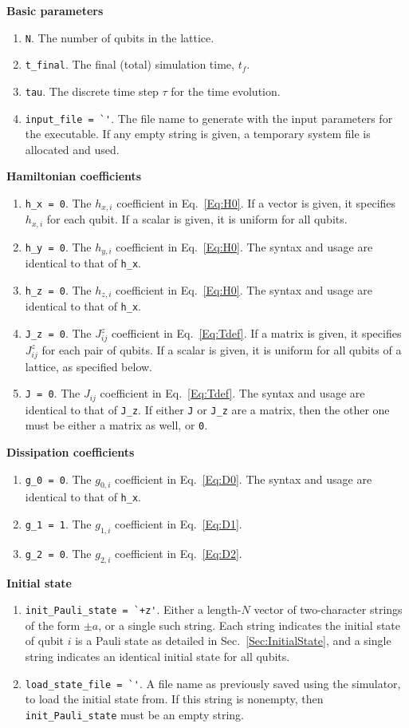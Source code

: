 \documentclass[aps,10pt,pra,twocolumn,groupedaddress,floatfix,superscriptaddress,showpacs,showkeys,amsfonts]{revtex4-2}
\newcommand{\eq}[1]{Eq.~\eqref{#1}}
\newcommand{\seq}[1]{Sec.~\ref{#1}}
\begin{document}
\noindent \textbf{Basic parameters}
\begin{enumerate}
\item \verb|N|. The number of qubits in the lattice.
\item \verb|t_final|. The final (total) simulation time, $t_f$.
\item \verb|tau|. The discrete time step $\tau$ for the time evolution.
\item \verb|input_file = `'|. The file name to generate with the input parameters for the executable. If any empty string is given, a temporary system file is allocated and used.
\end{enumerate}

\noindent \textbf{Hamiltonian coefficients}
\begin{enumerate}
\item \verb|h_x = 0|. The $h_{x,i}$ coefficient in \eq{Eq:H0}. If a vector is given, it specifies $h_{x,i}$ for each qubit. If a scalar is given, it is uniform for all qubits.
\item \verb|h_y = 0|. The $h_{y,i}$ coefficient in \eq{Eq:H0}. The syntax and usage are identical to that of \verb|h_x|.
\item \verb|h_z = 0|. The $h_{z,i}$ coefficient in \eq{Eq:H0}. The syntax and usage are identical to that of \verb|h_x|.
\item \verb|J_z = 0|. The $J^z_{ij}$ coefficient in \eq{Eq:Tdef}. If a matrix is given, it specifies $J^z_{ij}$ for each pair of qubits. If a scalar is given, it is uniform for all qubits of a lattice, as specified below.
\item \verb|J = 0|. The $J_{ij}$ coefficient in \eq{Eq:Tdef}. The syntax and usage are identical to that of \verb|J_z|. If either \verb|J| or \verb|J_z| are a matrix, then the other one must be either a matrix as well, or \verb|0|.
\end{enumerate}

\noindent \textbf{Dissipation coefficients}
\begin{enumerate}
\item \verb|g_0 = 0|. The $g_{0,i}$ coefficient in \eq{Eq:D0}. The syntax and usage are identical to that of \verb|h_x|.
\item \verb|g_1 = 1|. The $g_{1,i}$ coefficient in \eq{Eq:D1}.
\item \verb|g_2 = 0|. The $g_{2,i}$ coefficient in \eq{Eq:D2}.
\end{enumerate}

\noindent \textbf{Initial state}
\begin{enumerate}
\item \verb|init_Pauli_state = `+z'|. Either a length-$N$ vector of two-character strings of the form $\pm a$, or a single such string. Each string indicates the initial state of qubit $i$ is a Pauli state as detailed in \seq{Sec:InitialState}, and a single string indicates an identical initial state for all qubits.
\item \verb|load_state_file = `'|. A file name as previously saved using the simulator, to load the initial state from. If this string is nonempty, then \verb|init_Pauli_state| must be an empty string.
\end{enumerate}
\end{document}
